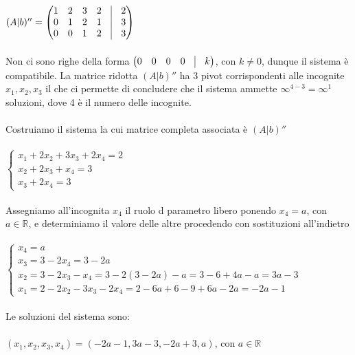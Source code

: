 \documentclass{report}
\begin{document}
{\\
$  
(A|b)'' = \begin{pmatrix}
  1 & 2 & 3 & 2 & \vline & 2 \\
  0 & 1 & 2 & 1 & \vline & 3 \\
  0 & 0 & 1 & 2 & \vline & 3 
\end{pmatrix}
$
\\
\\
Non ci sono righe della forma $\begin{pmatrix}
  0 & 0 & 0 & 0 & \vline & k
\end{pmatrix}$, con $k \neq 0$, dunque il sistema è compatibile. La matrice ridotta $(A|b)''$ ha 3 pivot corrispondenti alle incognite $x_1,x_2,x_3$ il che ci permette di concludere che il sistema ammette $\infty^{4-3} = \infty^1$ soluzioni, dove 4 è il numero delle incognite.
\\
\\
Costruiamo il sistema la cui matrice completa associata è $(A|b)''$
\\
\\
$  
\begin{cases}
  x_1 + 2x_2 + 3x_3 + 2x_4 = 2 \\
  x_2 + 2x_3 + x_4 = 3 \\
  x_3 + 2x_4 = 3
\end{cases}
$
\\
\\
Assegniamo all'incognita $x_4$ il ruolo d parametro libero ponendo $x_4 = a$, con $a \in \mathbb{R}$, e determiniamo il valore delle altre procedendo con sostituzioni all'indietro
\\
\\
$  
\begin{cases}
  x_4 = a \\
  x_3 = 3 -2x_4 = 3 - 2a \\
  x_2 = 3 -2x_3 - x_4 = 3 - 2(3 - 2a) - a = 3 - 6 + 4a - a = 3a - 3 \\
  x_1 = 2 - 2x_2 -3x_3 -2x_4 = 2 -6a + 6 - 9 + 6a -2a = -2a -1
\end{cases}
$
\\
\\
Le soluzioni del sistema sono:
\\
\\
$(x_1,x_2,x_3,x_4) = (-2a-1,3a-3,-2a+3,a)$, con $a \in \mathbb{R}$
}
\end{document}
